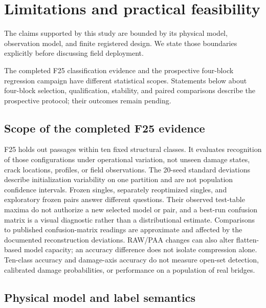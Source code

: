 \section{Limitations and practical feasibility}
\label{sec:limitations}

The claims supported by this study are bounded by its physical model,
observation model, and finite registered design. We state those boundaries
explicitly before discussing field deployment.

The completed F25 classification evidence and the prospective four-block
regression campaign have different statistical scopes. Statements below about
four-block selection, qualification, stability, and paired comparisons describe
the prospective protocol; their outcomes remain pending.

\subsection{Scope of the completed F25 evidence}

F25 holds out passages within ten fixed structural classes. It evaluates
recognition of those configurations under operational variation, not unseen
damage states, crack locations, profiles, or field observations. The 20-seed
standard deviations describe initialization variability on one partition and
are not population confidence intervals. Frozen singles, separately
reoptimized singles, and exploratory frozen pairs answer different questions.
Their observed test-table maxima do not authorize a new selected model or
pair, and a best-run confusion matrix is a visual diagnostic rather than a
distributional estimate. Comparisons to published confusion-matrix readings
are approximate and affected by the documented reconstruction deviations.
RAW/PAA changes can also alter flatten-based model capacity; an accuracy
difference does not isolate compression alone. Ten-class accuracy and
damage-axis accuracy do not measure open-set detection, calibrated damage
probabilities, or performance on a population of real bridges.

\subsection{Physical model and label semantics}

